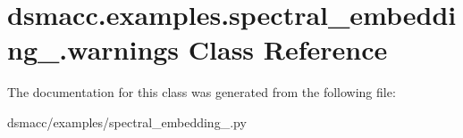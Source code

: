 \hypertarget{classdsmacc_1_1examples_1_1spectral__embedding___1_1warnings}{}\section{dsmacc.\+examples.\+spectral\+\_\+embedding\+\_\+.\+warnings Class Reference}
\label{classdsmacc_1_1examples_1_1spectral__embedding___1_1warnings}


The documentation for this class was generated from the following file\+:\begin{DoxyCompactItemize}
\item 
dsmacc/examples/spectral\+\_\+embedding\+\_\+.\+py\end{DoxyCompactItemize}
